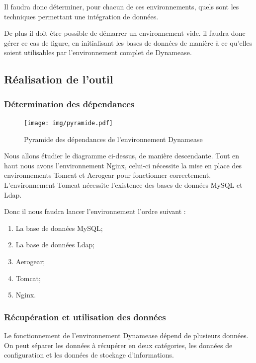 Il faudra donc déterminer, pour chacun de ces environnements, quels sont les techniques permettant une intégration de données.

De plus il doit être possible de démarrer un environnement vide. il faudra donc gérer ce cas de figure, en initialisant les bases de données de manière à ce qu'elles soient utilisables par l'environnement complet de Dynamease.

\subsection{Réalisation de l'outil}

\subsubsection{Détermination des dépendances}

\begin{figure}[!h]
	\centering
	\texttt{[image: img/pyramide.pdf]}
	\caption{\label{pyramide} Pyramide des dépendances de l'environnement Dynamease}
\end{figure}

Nous allons étudier le diagramme ci-dessus, de manière descendante. Tout en haut nous avons l'environnement Nginx, celui-ci nécessite la mise en place des environnements Tomcat et Aerogear pour fonctionner correctement. L'environnement Tomcat nécessite l'existence des bases de données MySQL et Ldap. 

Donc il nous faudra lancer l'environnement l'ordre suivant :

\begin{enumerate}
	\item La base de données MySQL;
	\item La base de données Ldap;
	\item Aerogear;
	\item Tomcat;
	\item Nginx.
\end{enumerate}

\subsubsection{Récupération et utilisation des données}

Le fonctionnement de l'environnement Dynamease dépend de plusieurs données. On peut séparer les données à récupérer en deux catégories, les données de configuration et les données de stockage d'informations.

